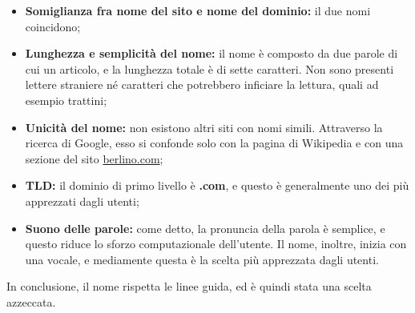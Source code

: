 \begin{itemize}
\item \textbf{Somiglianza fra nome del sito e nome del dominio:} il due nomi coincidono;
\item \textbf{Lunghezza e semplicità del nome:} il nome è composto da due parole di cui un articolo, e la lunghezza totale è di sette caratteri. Non sono presenti lettere straniere né caratteri che potrebbero inficiare la lettura, quali ad esempio trattini;
\item \textbf{Unicità del nome:} non esistono altri siti con nomi simili. Attraverso la ricerca di Google, esso si confonde solo con la pagina di Wikipedia e con una sezione del sito \href{http://www.berlino.com}{berlino.com};
\item \textbf{TLD:} il dominio di primo livello è \textbf{.com}, e questo è generalmente uno dei più apprezzati dagli utenti;
\item \textbf{Suono delle parole:} come detto, la pronuncia della parola è semplice, e questo riduce lo sforzo computazionale dell'utente. Il nome, inoltre, inizia con una vocale, e mediamente questa è la scelta più apprezzata dagli utenti.
\end{itemize}
In conclusione, il nome rispetta le linee guida, ed è quindi stata una scelta azzeccata.